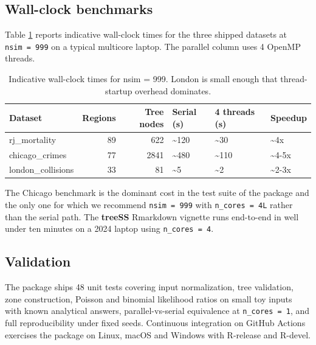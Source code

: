 \hypertarget{wall-clock-benchmarks}{%
\subsection{Wall-clock benchmarks}\label{wall-clock-benchmarks}}

Table \ref{tab:bench} reports indicative wall-clock times for the three
shipped datasets at \texttt{nsim\ =\ 999} on a typical multicore laptop. The
parallel column uses 4 OpenMP threads.

\begin{table}

\caption{\label{tab:bench}Indicative wall-clock times for nsim = 999. London is small enough that thread-startup overhead dominates.}
\centering
\begin{tabular}[t]{lrrlll}
\toprule
Dataset & Regions & Tree nodes & Serial (s) & 4 threads (s) & Speedup\\
\midrule
rj\_mortality & 89 & 622 & \textasciitilde{}120 & \textasciitilde{}30 & \textasciitilde{}4x\\
chicago\_crimes & 77 & 2841 & \textasciitilde{}480 & \textasciitilde{}110 & \textasciitilde{}4-5x\\
london\_collisions & 33 & 81 & \textasciitilde{}5 & \textasciitilde{}2 & \textasciitilde{}2-3x\\
\bottomrule
\end{tabular}
\end{table}

The Chicago benchmark is the dominant cost in the test suite of the
package and the only one for which we recommend \texttt{nsim\ =\ 999} with
\texttt{n\_cores\ =\ 4L} rather than the serial path. The \textbf{treeSS} Rmarkdown
vignette runs end-to-end in well under ten minutes on a 2024 laptop
using \texttt{n\_cores\ =\ 4}.

\hypertarget{validation}{%
\subsection{Validation}\label{validation}}

The package ships 48 unit tests covering input normalization, tree
validation, zone construction, Poisson and binomial likelihood ratios on
small toy inputs with known analytical answers, parallel-vs-serial
equivalence at \texttt{n\_cores\ =\ 1}, and full reproducibility under fixed seeds.
Continuous integration on GitHub Actions exercises the package on
Linux, macOS and Windows with R-release and R-devel.

